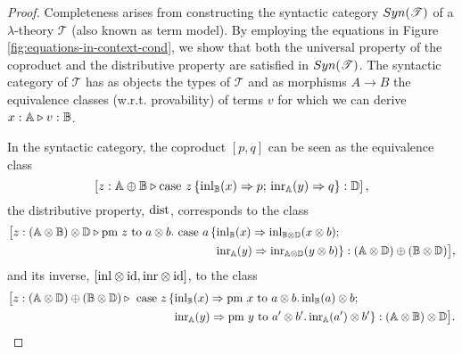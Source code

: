 \documentclass[a4paper,UKenglish,cleveref, autoref, thm-restate]{lipics-v2021}
\begin{document}
\begin{proof}
  Completeness arises from constructing the syntactic category $\catSyn(\mathscr{T})$ of a $\lambda$-theory $\mathscr{T}$ (also known as term model). By employing the equations in Figure \ref{fig:equations-in-context-cond}, we show that both the universal property of the coproduct and the distributive property are satisfied in $\catSyn(\mathscr{T})$. The syntactic category of $\mathscr{T}$ has as objects the types of $\mathscr{T}$ and as morphisms $A \rightarrow B$ the equivalence classes (w.r.t. provability) of terms $v$ for which we can derive $x : \mathbb{A} \triangleright v : \mathbb{B}$.

  In the syntactic category, the coproduct $[ p ,  q]$ can be seen as the equivalence
  class 
  $$\left[z:\mathbb{A} \oplus\mathbb{B} \triangleright \text{case } z\,\{\mathrm{inl}_{\mathbb{B}}(x) \Rightarrow p ; \, \mathrm{inr}_{\mathbb{A}}(y) \Rightarrow q\}: \mathbb{D}\right],$$ 
  the distributive property, $\mathrm{dist}$, corresponds to the class 
  \begin{align*}
    \big[z:(\mathbb{A} \otimes \mathbb{\mathbb{B}}) \otimes \mathbb{\mathbb{D}} \triangleright \text{pm } z \text{ to } a \otimes b. \text{ case } a\,\{ &\mathrm{inl}_{\mathbb{B}}(x) \Rightarrow \mathrm{inl}_{\mathbb{B} \otimes \mathbb{D}}(x \otimes b); \\
    & \mathrm{inr}_{\mathbb{A}}(y) \Rightarrow \mathrm{inr}_{\mathbb{A} \otimes \mathbb{D}} (y \otimes b)\}: (\mathbb{A} \otimes \mathbb{D}) \oplus (\mathbb{B} \otimes \mathbb{D})\big],
  \end{align*}
and its inverse, $[\mathrm{inl} \otimes \mathrm{id}, \mathrm{inr} \otimes \mathrm{id}]$, to the class
\begin{align*}
  \big[z: (\mathbb{A} \otimes \mathbb{D}) \oplus (\mathbb{B} \otimes \mathbb{D}) \triangleright  \text{ case } z \,\{ &\mathrm{inl}_{\mathbb{B}}(x) \Rightarrow \text{pm } x \text{ to } a \otimes b. \, \mathrm{inl}_{\mathbb{B}}(a) \otimes b; \\
  & \mathrm{inr}_{\mathbb{A}}(y) \Rightarrow \text{pm } y \text{ to } a' \otimes b'. \, \mathrm{inr}_{\mathbb{A}}(a') \otimes b'\}: (\mathbb{A} \otimes \mathbb{\mathbb{B}}) \otimes \mathbb{\mathbb{D}}\big].
\end{align*}



\end{proof}
\end{document}
